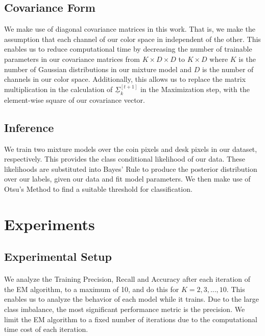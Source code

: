 \documentclass[11pt]{article}
\begin{document}
	\subsection{Covariance Form} We make use of diagonal covariance matrices in this work. That is, we make the assumption that each channel of our color space in independent of the other. This enables us to reduce computational time by decreasing the number of trainable parameters in our covariance matrices from $K \times D \times D$ to $K \times D$ where $K$ is the number of  Gaussian distributions in our mixture model and $D$ is the number of channels in our color space. Additionally, this allows us to replace the matrix multiplication in the calculation of $\underline{\Sigma}^{[t+1]}_{k}$ in the Maximization step, with the element-wise square of our covariance vector.

	\subsection{Inference}
	
		We train two mixture models over the coin pixels and desk pixels in our dataset, respectively. This provides the class conditional likelihood of our data. These likelihoods are substituted into Bayes' Rule to produce the posterior distribution over our labels, given our data and fit model parameters. We then make use of Otsu's Method to find a suitable threshold for classification.
	
	\section{Experiments}
			
	\subsection{Experimental Setup}	
	\paragraph{}We analyze the Training Precision, Recall and Accuracy after each iteration of the EM algorithm, to a maximum of 10, and do this for $K = 2, 3, ..., 10$. This enables us to analyze the behavior of each model while it trains. Due to the large class imbalance, the most significant performance metric is the precision. We limit the EM algorithm to a fixed number of iterations due to the computational time cost of each iteration.
		
\end{document}

